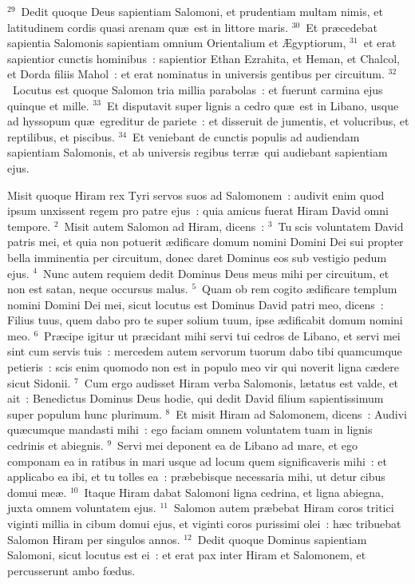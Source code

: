 ${}^{29}$~Dedit quoque Deus sapientiam Salomoni, et prudentiam multam nimis, et latitudinem cordis quasi arenam qu\ae\ est in littore maris.
${}^{30}$~Et pr\ae cedebat sapientia Salomonis sapientiam omnium Orientalium et \AE gyptiorum,
${}^{31}$~et erat sapientior cunctis hominibus~: sapientior Ethan Ezrahita, et Heman, et Chalcol, et Dorda filiis Mahol~: et erat nominatus in universis gentibus per circuitum.
${}^{32}$~Locutus est quoque Salomon tria millia parabolas~: et fuerunt carmina ejus quinque et mille.
${}^{33}$~Et disputavit super lignis a cedro qu\ae\ est in Libano, usque ad hyssopum qu\ae\ egreditur de pariete~: et disseruit de jumentis, et volucribus, et reptilibus, et piscibus.
${}^{34}$~Et veniebant de cunctis populis ad audiendam sapientiam Salomonis, et ab universis regibus terr\ae\ qui audiebant sapientiam ejus.

\lettrine[lines=10,image=true,loversize=0.05,lraise=-0.03]{M}{}isit quoque Hiram rex Tyri servos suos ad Salomonem~: audivit enim quod ipsum unxissent regem pro patre ejus~: quia amicus fuerat Hiram David omni tempore.
${}^{2}$~Misit autem Salomon ad Hiram, dicens~:
${}^{3}$~Tu scis voluntatem David patris mei, et quia non potuerit \ae dificare domum nomini Domini Dei sui propter bella imminentia per circuitum, donec daret Dominus eos sub vestigio pedum ejus.
${}^{4}$~Nunc autem requiem dedit Dominus Deus meus mihi per circuitum, et non est satan, neque occursus malus.
${}^{5}$~Quam ob rem cogito \ae dificare templum nomini Domini Dei mei, sicut locutus est Dominus David patri meo, dicens~: Filius tuus, quem dabo pro te super solium tuum, ipse \ae dificabit domum nomini meo.
${}^{6}$~Pr\ae cipe igitur ut pr\ae cidant mihi servi tui cedros de Libano, et servi mei sint cum servis tuis~: mercedem autem servorum tuorum dabo tibi quamcumque petieris~: scis enim quomodo non est in populo meo vir qui noverit ligna c\ae dere sicut Sidonii.
${}^{7}$~Cum ergo audisset Hiram verba Salomonis, l\ae tatus est valde, et ait~: Benedictus Dominus Deus hodie, qui dedit David filium sapientissimum super populum hunc plurimum.
${}^{8}$~Et misit Hiram ad Salomonem, dicens~: Audivi qu\ae cumque mandasti mihi~: ego faciam omnem voluntatem tuam in lignis cedrinis et abiegnis.
${}^{9}$~Servi mei deponent ea de Libano ad mare, et ego componam ea in ratibus in mari usque ad locum quem significaveris mihi~: et applicabo ea ibi, et tu tolles ea~: pr\ae bebisque necessaria mihi, ut detur cibus domui me\ae .
${}^{10}$~Itaque Hiram dabat Salomoni ligna cedrina, et ligna abiegna, juxta omnem voluntatem ejus.
${}^{11}$~Salomon autem pr\ae bebat Hiram coros tritici viginti millia in cibum domui ejus, et viginti coros purissimi olei~: h\ae c tribuebat Salomon Hiram per singulos annos.
${}^{12}$~Dedit quoque Dominus sapientiam Salomoni, sicut locutus est ei~: et erat pax inter Hiram et Salomonem, et percusserunt ambo fœdus.


